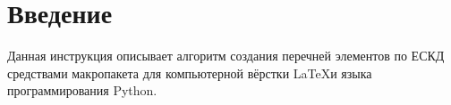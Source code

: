 \section{Введение}

Данная инструкция описывает алгоритм создания перечней элементов по ЕСКД средствами макропакета для компьютерной вёрстки \LaTeX и языка программирования Python.